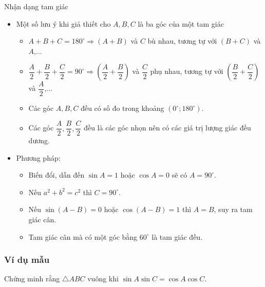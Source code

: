 \begin{dang}{Nhận dạng tam giác}
\begin{itemize}
\item Một số lưu ý khi giả thiết cho $A,B,C$ là ba góc của một tam giác
	\begin{itemize}
		\item $A+B+C=180^\circ \Rightarrow (A+B)$ và $C$ bù nhau, tương tự với $(B+C)$ và $A$,...
		\item $\dfrac{A}{2}+\dfrac{B}{2}+\dfrac{C}{2}=90^\circ \Rightarrow \left(\dfrac{A}{2}+\dfrac{B}{2} \right)$ và $\dfrac{C}{2}$ phụ nhau, tương tự với $\left(\dfrac{B}{2}+\dfrac{C}{2} \right)$ và $\dfrac{A}{2}$,...
		\item Các góc $A,B,C$ đều có số đo trong khoảng $\left(0^\circ;180^\circ \right)$.
		\item Các góc $\dfrac{A}{2},\dfrac{B}{2},\dfrac{C}{2}$ đều là các góc nhọn nên có các giá trị lượng giác đều dương.
	\end{itemize}
\item Phương pháp:
	\begin{itemize}
		\item  Biến đổi, dẫn đến $\sin A = 1$ hoặc $\cos A = 0$ sẽ có $A=90^\circ$.
		\item  Nếu $a^2+b^2=c^2$ thì $C=90^\circ$.
		\item  Nếu $\sin (A - B) = 0$ hoặc $\cos (A - B) = 1$ thì $A=B$, suy ra tam giác cân.
		\item Tam giác cân mà có một góc bằng $60^\circ$ là tam giác đều.
	\end{itemize}
\end{itemize}
\end{dang}

\subsubsection{Ví dụ mẫu}
\begin{vd}%
Chứng minh rằng $\triangle ABC$ vuông khi $\sin A\sin C = \cos A\cos C$.
\end{vd}


